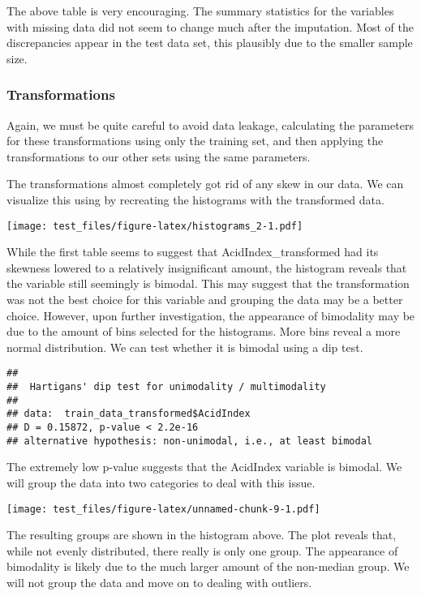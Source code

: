 \documentclass[
]{article}
\begin{document}
The above table is very encouraging. The summary statistics for the
variables with missing data did not seem to change much after the
imputation. Most of the discrepancies appear in the test data set, this
plausibly due to the smaller sample size.

\subsubsection{Transformations}\label{transformations}

Again, we must be quite careful to avoid data leakage, calculating the
parameters for these transformations using only the training set, and
then applying the transformations to our other sets using the same
parameters.

The transformations almost completely got rid of any skew in our data.
We can visualize this using by recreating the histograms with the
transformed data.

\texttt{[image: test\_files/figure-latex/histograms\_2-1.pdf]}

While the first table seems to suggest that AcidIndex\_transformed had
its skewness lowered to a relatively insignificant amount, the histogram
reveals that the variable still seemingly is bimodal. This may suggest
that the transformation was not the best choice for this variable and
grouping the data may be a better choice. However, upon further
investigation, the appearance of bimodality may be due to the amount of
bins selected for the histograms. More bins reveal a more normal
distribution. We can test whether it is bimodal using a dip test.

\begin{verbatim}
## 
##  Hartigans' dip test for unimodality / multimodality
## 
## data:  train_data_transformed$AcidIndex
## D = 0.15872, p-value < 2.2e-16
## alternative hypothesis: non-unimodal, i.e., at least bimodal
\end{verbatim}

The extremely low p-value suggests that the AcidIndex variable is
bimodal. We will group the data into two categories to deal with this
issue.

\texttt{[image: test\_files/figure-latex/unnamed-chunk-9-1.pdf]}

The resulting groups are shown in the histogram above. The plot reveals
that, while not evenly distributed, there really is only one group. The
appearance of bimodality is likely due to the much larger amount of the
non-median group. We will not group the data and move on to dealing with
outliers.
\end{document}
